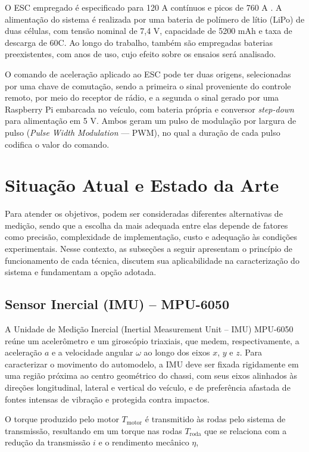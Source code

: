 O ESC empregado é especificado para 120 A contínuos e picos de 760 A \cite{orion_vortex_r8}.
A alimentação do sistema é realizada por uma bateria de polímero de lítio (LiPo) de duas células, com tensão nominal de 7,4 V,
capacidade de 5200 mAh e taxa de descarga de 60C. Ao longo do trabalho, também são empregadas baterias
preexistentes, com anos de uso, cujo efeito sobre os ensaios será analisado. 


O comando de aceleração aplicado ao ESC
pode ter duas origens, selecionadas por uma chave de comutação, sendo a primeira o sinal
proveniente do controle remoto, por meio do receptor de rádio, e a segunda o sinal
gerado por uma Raspberry Pi embarcada no veículo, com bateria própria e conversor
\emph{step-down} para alimentação em 5 V. Ambos geram um pulso de modulação por largura de
pulso (\emph{Pulse Width Modulation} — PWM), no qual a duração de cada pulso codifica o
valor do comando.


\section{Situação Atual e Estado da Arte}
\label{sec:estadoarte}

Para atender os objetivos, podem ser consideradas
diferentes alternativas de medição, sendo que a escolha da mais adequada entre elas depende de fatores
como precisão, complexidade de implementação, custo e adequação às condições experimentais.
Nesse contexto, as subseções a seguir apresentam o princípio de funcionamento de cada técnica,
discutem sua aplicabilidade na caracterização do sistema e fundamentam a opção adotada.

\subsection{Sensor Inercial (IMU) -- MPU-6050}
\label{sec:imu}

A Unidade de Medição Inercial (Inertial Measurement Unit -- IMU) MPU-6050 reúne um acelerômetro 
e um giroscópio triaxiais, que medem, respectivamente, a aceleração \(a\) e a velocidade 
angular \(\omega\) ao longo dos eixos \(x\), \(y\) e \(z\). Para caracterizar o movimento do automodelo, 
a IMU deve ser fixada rigidamente em uma região próxima ao centro geométrico do
chassi, com seus eixos alinhados às direções longitudinal, lateral e vertical do veículo,
e de preferência afastada de fontes intensas de vibração e protegida contra impactos.

O torque produzido pelo motor \(T_{\mathrm{motor}}\) é transmitido às rodas pelo sistema de transmissão, 
resultando em um torque nas rodas \(T_{\mathrm{roda}}\) que se relaciona com a redução da transmissão \(i\) e o 
rendimento mecânico \(\eta\),

